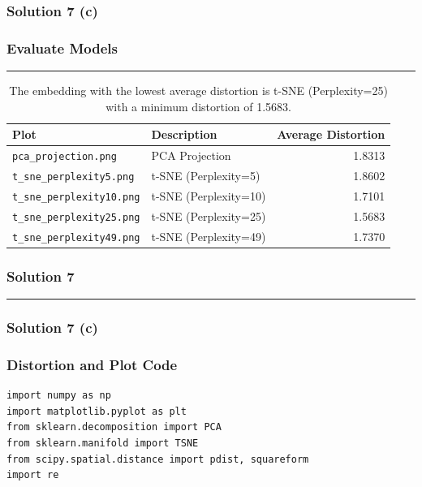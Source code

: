 \documentclass{article}
\begin{document}
{\subsubsection*{Solution 7 (c)}
\subsubsection*{Evaluate Models}

\noindent\rule{\textwidth}{0.4pt}
\begin{table}[h]
\centering


\begin{tabular}{llr}
\toprule
\textbf{Plot} & \textbf{Description} & \textbf{Average Distortion} \\
\midrule
\texttt{pca\_projection.png} & PCA Projection & 1.8313 \\
\texttt{t\_sne\_perplexity5.png} & t-SNE (Perplexity=5) & 1.8602 \\
\texttt{t\_sne\_perplexity10.png} & t-SNE (Perplexity=10) & 1.7101 \\
\texttt{t\_sne\_perplexity25.png} & t-SNE (Perplexity=25) & 1.5683 \\
\texttt{t\_sne\_perplexity49.png} & t-SNE (Perplexity=49) & 1.7370 \\
\bottomrule
\end{tabular}

\vspace{1em}
\caption[Distortion Analysis]{The embedding with the lowest average distortion is t-SNE (Perplexity=25) with a minimum distortion of 1.5683.}
\label{tab:distortion_analysis}

\end{table}

\newpage

\subsubsection*{Solution 7}
\noindent\rule{\textwidth}{0.4pt}
\subsubsection*{Solution 7 (c)}
\subsubsection*{Distortion and Plot Code}
\begin{lstlisting}
import numpy as np
import matplotlib.pyplot as plt
from sklearn.decomposition import PCA
from sklearn.manifold import TSNE
from scipy.spatial.distance import pdist, squareform
import re 


\end{lstlisting}}
\end{document}
